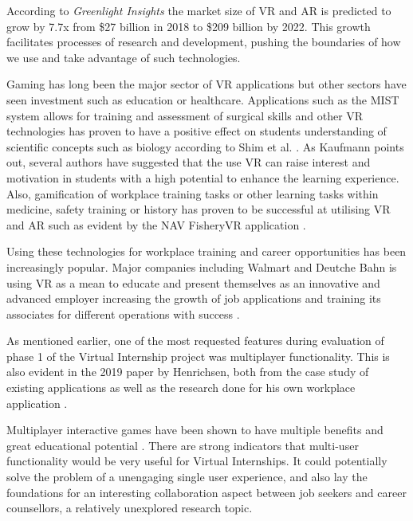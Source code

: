 According to \textit{Greenlight Insights} \cite{forcastVR} the market size of VR and AR is predicted to grow by 7.7x from \$27 billion in 2018 to \$209 billion by 2022. This growth facilitates processes of research and development, pushing the boundaries of how we use and take advantage of such technologies.

Gaming has long been the major sector of VR applications but other sectors have seen investment such as education or healthcare. Applications such as the MIST system \cite{mccloy2001virtual} allows for training and assessment of surgical skills and other VR technologies has proven to have a positive effect on students understanding of scientific concepts such as biology according to Shim et al. \cite{shim2003application}. As Kaufmann \cite{kaufmann2003collaborative} points out, several authors have suggested that the use VR can raise interest and motivation in students with a high potential to enhance the learning experience.
Also, gamification of workplace training tasks or other learning tasks within medicine, safety training or history has proven to be successful at utilising VR and AR such as evident by the NAV FisheryVR application \cite{fishfarmNAV}. 

Using these technologies for workplace training and career opportunities has been increasingly popular. Major companies including  Walmart and Deutche Bahn is using VR as a mean to educate and present themselves as an innovative and advanced employer increasing the growth of job applications and training its associates for different operations with success \cite{vasilenko2019virtual}.    

As mentioned earlier, one of the most requested features during evaluation of phase 1 of the Virtual Internship project was multiplayer functionality. This is also evident in the 2019 paper by Henrichsen, both from the case study of existing applications as well as the research done for his own workplace application \cite{henrichsen2019engaging}.

Multiplayer interactive games have been shown to have multiple benefits and great educational potential \cite{ducheneaut2006alone} \cite{nardi2006strangers} \cite{steiner2006play}. There are strong indicators that multi-user functionality would be very useful for Virtual Internships. It could potentially solve the problem of a unengaging single user experience, and also lay the foundations for an interesting collaboration aspect between job seekers and career counsellors, a relatively unexplored research topic.   




